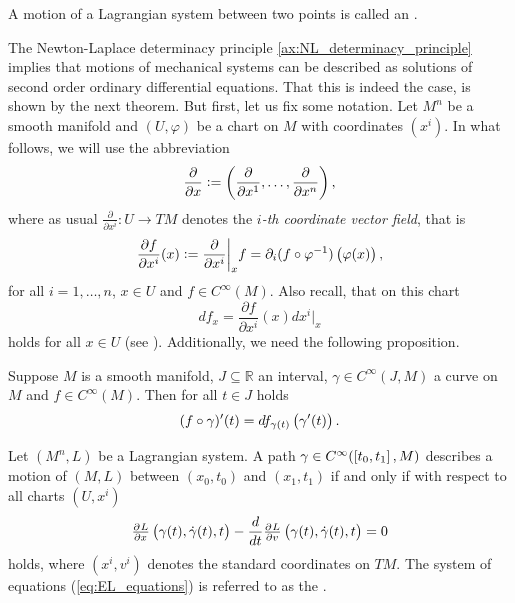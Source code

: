 \begin{definition}[Extremal]
	A motion of a Lagrangian system between two points is called an .
\end{definition}

The Newton-Laplace determinacy principle \ref{ax:NL_determinacy_principle} implies that motions of mechanical systems can be described as solutions of second order ordinary differential equations. That this is indeed the case, is shown by the next theorem. But first, let us fix some notation. Let $M^n$ be a smooth manifold and $(U,\varphi)$ be a chart on $M$ with coordinates $(x^i)$. In what follows, we will use the abbreviation
\begin{equation*}
	\frac{\partial}{\partial x} := \del[3]{\frac{\partial}{\partial x^1},\dots,\frac{\partial}{\partial x^n}},
\end{equation*}
\noindent where as usual $\frac{\partial}{\partial x^i} : U \to TM$ denotes the \emph{$i$-th coordinate vector field}, that is
\begin{equation*}
	\frac{\partial f}{\partial x^i}(x) := \frac{\partial}{\partial x^i}\bigg\vert_x f = \partial_i(f \circ \varphi^{-1})\del[1]{\varphi(x)},
\end{equation*}
\noindent for all $i = 1,\dots,n$, $x \in U$ and $f \in C^\infty(M)$. Also recall, that on this chart
\begin{equation}
	\label{eq:differential_of_a_function}
	df_x = \frac{\partial f}{\partial x^i}(x)dx^i\vert_x
\end{equation}
\noindent holds for all $x \in U$ (see \cite[281]{lee:smooth_manifolds:2013}). Additionally, we need the following proposition.

\begin{proposition}
	\label{prop:derivative_of_a_function_along_a_curve}
	Suppose $M$ is a smooth manifold, $J \subseteq \mathbb{R}$ an interval, $\gamma \in C^\infty(J,M)$ a curve on $M$ and $f \in C^\infty(M)$. Then for all $t \in J$ holds
	\begin{equation*}
		(f \circ \gamma)'(t) = df_{\gamma(t)}\del[1]{\gamma'(t)}.
	\end{equation*}
\end{proposition}

\begin{theorem}
	\label{thm:EL_equations}
	Let $(M^n,L)$ be a Lagrangian system. A path $\gamma \in C^\infty(\intcc[0]{t_0,t_1},M)$ describes a motion of $(M,L)$ between $(x_0,t_0)$ and $(x_1,t_1)$ if and only if with respect to all charts $(U,x^i)$
	\begin{equation}
		\label{eq:EL_equations}
		\pd{L}{x}\del[1]{\gamma(t),\dot{\gamma}(t),t} - \frac{d}{dt} \pd{L}{v}\del[1]{\gamma(t),\dot{\gamma}(t),t} = 0
	\end{equation}
	\noindent holds, where $(x^i,v^i)$ denotes the standard coordinates on $TM$. The system of equations \textup{(}\ref{eq:EL_equations}\textup{)} is referred to as the .
\end{theorem}


